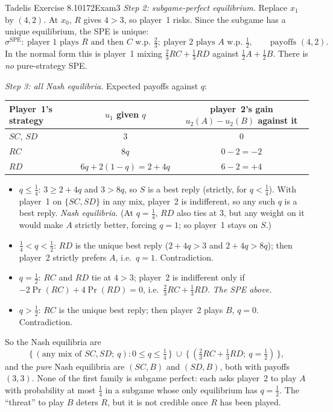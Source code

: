 \begin{exsol}{Tadelis Exercise 8.10}{172}{Exam}{3}
\emph{Step 2: subgame-perfect equilibrium.} Replace $x_1$ by $(4,2)$. At $x_0$, $R$ gives $4 > 3$,
so player~1 risks. Since the subgame has a unique equilibrium, the SPE is unique:
\[
  \sigma^{\text{SPE}}:\ \text{player 1 plays } R \text{ and then } C \text{ w.p. } \tfrac23;\
  \text{player 2 plays } A \text{ w.p. } \tfrac12,\qquad \text{payoffs } (4, 2).
\]
In the normal form this is player~1 mixing $\frac23 RC + \frac13 RD$ against $\frac12 A + \frac12 B$.
There is \emph{no} pure-strategy SPE.

\emph{Step 3: all Nash equilibria.} Expected payoffs against $q$:
\begin{center}
\begin{tabular}{lcc}
\toprule
Player~1's strategy & $u_1$ given $q$ & player~2's gain $u_2(A) - u_2(B)$ against it \\
\midrule
$SC$, $SD$ & $3$ & $0$ \\
$RC$ & $8q$ & $0 - 2 = -2$ \\
$RD$ & $6q + 2(1-q) = 2 + 4q$ & $6 - 2 = +4$ \\
\bottomrule
\end{tabular}
\end{center}
\begin{itemize}
  \item $q \le \frac14$: $3 \ge 2 + 4q$ and $3 > 8q$, so $S$ is a best reply (strictly, for $q<\frac14$).
  With player~1 on $\{SC,SD\}$ in any mix, player~2 is indifferent, so any such $q$ is a best reply.
  \emph{Nash equilibria.} (At $q = \frac14$, $RD$ also ties at 3, but any weight on it would make
  $A$ strictly better, forcing $q = 1$; so player~1 stays on $S$.)
  \item $\frac14 < q < \frac12$: $RD$ is the unique best reply ($2+4q > 3$ and $2 + 4q > 8q$);
  then player~2 strictly prefers $A$, i.e.\ $q = 1$. Contradiction.
  \item $q = \frac12$: $RC$ and $RD$ tie at $4 > 3$; player~2 is indifferent only if
  $-2\Pr(RC) + 4\Pr(RD) = 0$, i.e.\ $\frac23 RC + \frac13 RD$. \emph{The SPE above.}
  \item $q > \frac12$: $RC$ is the unique best reply; then player~2 plays $B$, $q = 0$. Contradiction.
\end{itemize}
So the Nash equilibria are
\[
  \bigl\{\,(\text{any mix of } SC, SD;\ q) : 0 \le q \le \tfrac14 \,\bigr\}
  \ \cup\ \bigl\{\,(\tfrac23 RC + \tfrac13 RD;\ q = \tfrac12)\,\bigr\},
\]
and the \emph{pure} Nash equilibria are $(SC, B)$ and $(SD, B)$, both with payoffs $(3,3)$.
None of the first family is subgame perfect: each asks player~2 to play $A$ with probability at
most $\frac14$ in a subgame whose only equilibrium has $q = \frac12$. The ``threat'' to play $B$
deters $R$, but it is not credible once $R$ has been played.


\end{exsol}
